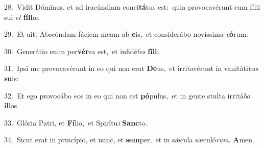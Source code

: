 {\numbfont\textcolor{\numbcolor}{28.}}~Vidit Dóminus, et ad iracúndiam conci\-\textbf{tá}\-tus est:~\star quia provocavérunt eum fílii sui \textit{et} \textbf{fí}\-\textbf{li}æ.\par
{\numbfont\textcolor{\numbcolor}{29.}}~Et ait: Abscóndam fáciem meam ab \textbf{e}\-is,~\star et considerábo novíssima \textit{e}\-\textbf{ó}rum:\par
{\numbfont\textcolor{\numbcolor}{30.}}~Generátio enim per\-\textbf{vér}\-sa est,~\star et infidé\textit{les} \textbf{fí}\-\textbf{li}i.\par
{\numbfont\textcolor{\numbcolor}{31.}}~Ipsi me provocavérunt in eo qui non erat \textbf{De}\-us,~\star et irritavérunt in vanitáti\textit{bus} \textbf{su}\-is:\par
{\numbfont\textcolor{\numbcolor}{32.}}~Et ego provocábo eos in eo qui non est \textbf{pó}\-pulus,~\star et in gente stulta irritá\textit{bo} \textbf{il}\-los.\par
{\numbfont\textcolor{\numbcolor}{33.}}~Glória Patri, et \textbf{Fí}\-lio,~\star et Spirítu\textit{i} \textbf{Sanc}\-to.\par
{\numbfont\textcolor{\numbcolor}{34.}}~Sicut erat in princípio, et nunc, et \textbf{sem}\-per,~\star et in sǽcula sæculó\-\textit{rum}\-. \textbf{A}\-men.\par
